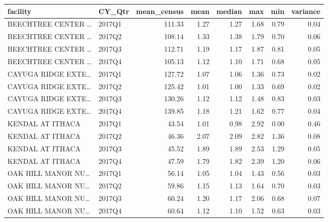 \documentclass[]{article}
\begin{document}
\begin{longtable}[]{@{}llrrrrrr@{}}
\toprule
facility & CY\_Qtr & mean\_census & mean & median & max & min &
variance\tabularnewline
\midrule
\endhead
BEECHTREE CENTER \ldots{} & 2017Q1 & 111.33 & 1.27 & 1.27 & 1.68 & 0.79
& 0.04\tabularnewline
BEECHTREE CENTER \ldots{} & 2017Q2 & 108.14 & 1.33 & 1.38 & 1.79 & 0.70
& 0.06\tabularnewline
BEECHTREE CENTER \ldots{} & 2017Q3 & 112.71 & 1.19 & 1.17 & 1.87 & 0.81
& 0.05\tabularnewline
BEECHTREE CENTER \ldots{} & 2017Q4 & 105.13 & 1.12 & 1.10 & 1.71 & 0.68
& 0.05\tabularnewline
CAYUGA RIDGE EXTE\ldots{} & 2017Q1 & 127.72 & 1.07 & 1.06 & 1.36 & 0.73
& 0.02\tabularnewline
CAYUGA RIDGE EXTE\ldots{} & 2017Q2 & 125.42 & 1.01 & 1.00 & 1.33 & 0.69
& 0.02\tabularnewline
CAYUGA RIDGE EXTE\ldots{} & 2017Q3 & 130.26 & 1.12 & 1.12 & 1.48 & 0.83
& 0.03\tabularnewline
CAYUGA RIDGE EXTE\ldots{} & 2017Q4 & 139.85 & 1.18 & 1.21 & 1.62 & 0.77
& 0.04\tabularnewline
KENDAL AT ITHACA & 2017Q1 & 43.54 & 1.01 & 0.98 & 2.92 & 0.00 &
0.46\tabularnewline
KENDAL AT ITHACA & 2017Q2 & 46.36 & 2.07 & 2.09 & 2.82 & 1.36 &
0.08\tabularnewline
KENDAL AT ITHACA & 2017Q3 & 45.52 & 1.89 & 1.89 & 2.53 & 1.29 &
0.05\tabularnewline
KENDAL AT ITHACA & 2017Q4 & 47.59 & 1.79 & 1.82 & 2.39 & 1.20 &
0.06\tabularnewline
OAK HILL MANOR NU\ldots{} & 2017Q1 & 56.14 & 1.05 & 1.04 & 1.43 & 0.56 &
0.03\tabularnewline
OAK HILL MANOR NU\ldots{} & 2017Q2 & 59.86 & 1.15 & 1.13 & 1.64 & 0.70 &
0.03\tabularnewline
OAK HILL MANOR NU\ldots{} & 2017Q3 & 60.24 & 1.20 & 1.17 & 2.06 & 0.68 &
0.07\tabularnewline
OAK HILL MANOR NU\ldots{} & 2017Q4 & 60.64 & 1.12 & 1.10 & 1.52 & 0.63 &
0.03\tabularnewline
\bottomrule
\end{longtable}
\end{document}
